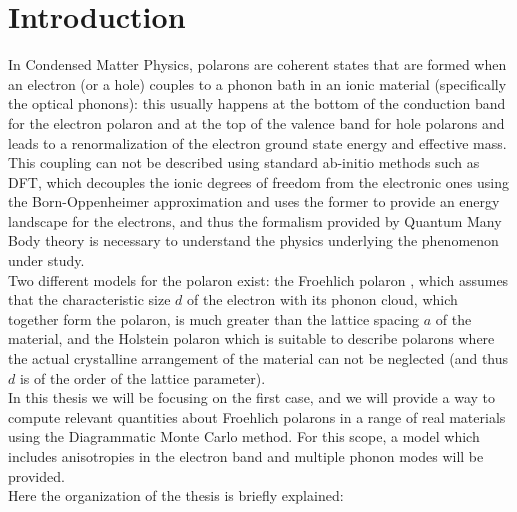 \section*{Introduction}
In Condensed Matter Physics, polarons are coherent states that are formed when an electron (or a hole) couples to a phonon bath in an ionic material (specifically the optical phonons): 
this usually happens at the bottom of the conduction band for the electron polaron and at the top of the valence band for hole polarons and leads to a renormalization of the electron 
ground state energy and effective mass.\\
This coupling can not be described using standard ab-initio methods such as DFT, which decouples the ionic degrees of freedom from the electronic ones using 
the Born-Oppenheimer approximation and uses the former to provide an energy landscape for the electrons, and thus the formalism provided by Quantum Many Body theory 
is necessary to understand the physics underlying the phenomenon under study.\\
Two different models for the polaron exist: the Froehlich polaron \cite{frohlich1954electrons}, which assumes that the characteristic size $d$ of the electron with its phonon cloud, 
which together form the polaron, is much greater than the lattice spacing $a$ of the material, and the Holstein polaron \cite{holstein1959studies}\cite{holstein1959studies01} which is suitable to describe 
polarons where the actual crystalline arrangement of the material can not be neglected (and thus $d$ is of the order of the lattice parameter).\\
In this thesis we will be focusing on the first case, and we will provide a way to compute relevant quantities about Froehlich polarons in a range 
of real materials using the Diagrammatic Monte Carlo method. For this scope, a model which includes anisotropies in the electron band and multiple phonon modes 
will be provided.\\
Here the organization of the thesis is briefly explained:
